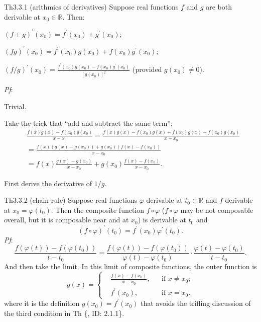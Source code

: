 \documentclass{article}
\begin{document}
\begin{Th}{Th3.3.1 (arithmics of derivatives)}
    Suppose real functions $f$ and $g$ are both derivable at $x_0\in\mathbb{R}$. Then:
    \begin{compactenum}
        \item $(f\pm g)^\prime(x_0) = f^\prime(x_0) \pm g^\prime(x_0)$;
        \item $(fg)^\prime(x_0) = f^\prime(x_0)g(x_0) + f(x_0)g^\prime(x_0)$;
        \item $(f/g)^\prime(x_0) = \frac{f^\prime(x_0)g(x_0) - f(x_0)g^\prime(x_0)}{[g(x_0)]^2}$ (provided $g(x_0)\neq 0$).
    \end{compactenum}
    \tcblower
    \textit{Pf}:
    \begin{compactenum}
        \item Trivial.
        \item Take the trick that ``add and subtract the same term'':
        $$
        \begin{aligned}
            & \frac{f(x)g(x) - f(x_0)g(x_0)}{x-x_0} = \frac{f(x)g(x) - f(x_0)g(x) + f(x_0)g(x) - f(x_0)g(x_0)}{x-x_0} \\
            &= \frac{f(x)(g(x)-g(x_0)) + g(x_0)(f(x)-f(x_0))}{x-x_0} \\
            &= f(x)\frac{g(x)-g(x_0)}{x-x_0} + g(x_0)\frac{f(x)-f(x_0)}{x-x_0}.
        \end{aligned}
        $$
        \item First derive the derivative of $1/g$.
    \end{compactenum}
\end{Th}

\begin{Th}{Th3.3.2 (chain-rule)}
    Suppose real functions $\varphi$ derivable at $t_0\in\mathbb{R}$ and $f$ derivable at $x_0 = \varphi(t_0)$. Then the composite function $f\circ\varphi$ ($f\circ\varphi$ may be not composable overall, but it is composable near and at $x_0$) is derivable at $t_0$ and 
    $$ (f\circ\varphi)^\prime(t_0) = f^\prime(x_0)\varphi^\prime(t_0). $$
    \tcblower
    \textit{Pf}: $$ \frac{f(\varphi(t))-f(\varphi(t_0))}{t-t_0} = \frac{f(\varphi(t))-f(\varphi(t_0))}{\varphi(t)-\varphi(t_0)}\cdot \frac{\varphi(t)-\varphi(t_0)}{t-t_0}. $$
    And then take the limit. In this limit of composite functions, the outer function is
    $$ g(x) = \left\{
        \begin{aligned}
            &\frac{f(x)-f(x_0)}{x-x_0}, && \text{if } x\neq x_0;\\
            &f^\prime(x_0), && \text{if } x = x_0.
        \end{aligned}\right.
    $$
    where it is the definition $g(x_0) = f^\prime(x_0)$ that avoids the trifling discussion of the third condition in Th \{, ID: 2.1.1\}.
\end{Th}
\end{document}
